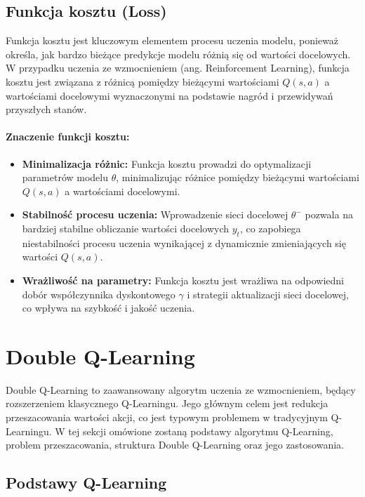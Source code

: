 \subsection{Funkcja kosztu (Loss)}

Funkcja kosztu jest kluczowym elementem procesu uczenia modelu, ponieważ określa, jak bardzo bieżące predykcje modelu różnią się od wartości docelowych. W przypadku uczenia ze wzmocnieniem (ang. Reinforcement Learning), funkcja kosztu jest związana z różnicą pomiędzy bieżącymi wartościami \(Q(s, a)\) a wartościami docelowymi wyznaczonymi na podstawie nagród i przewidywań przyszłych stanów.

\paragraph{Znaczenie funkcji kosztu:}
\begin{itemize}
	\item \textbf{Minimalizacja różnic:} Funkcja kosztu prowadzi do optymalizacji parametrów modelu \(\theta\), minimalizując różnice pomiędzy bieżącymi wartościami \(Q(s, a)\) a wartościami docelowymi.
	\item \textbf{Stabilność procesu uczenia:} Wprowadzenie sieci docelowej \(\theta^{-}\) pozwala na bardziej stabilne obliczanie wartości docelowych \(y_t\), co zapobiega niestabilności procesu uczenia wynikającej z dynamicznie zmieniających się wartości \(Q(s, a)\).
	\item \textbf{Wrażliwość na parametry:} Funkcja kosztu jest wrażliwa na odpowiedni dobór współczynnika dyskontowego \(\gamma\) i strategii aktualizacji sieci docelowej, co wpływa na szybkość i jakość uczenia.
\end{itemize}

\section{Double Q-Learning}

Double Q-Learning to zaawansowany algorytm uczenia ze wzmocnieniem, będący rozszerzeniem klasycznego Q-Learningu. Jego głównym celem jest redukcja przeszacowania wartości akcji, co jest typowym problemem w tradycyjnym Q-Learningu. W tej sekcji omówione zostaną podstawy algorytmu Q-Learning, problem przeszacowania, struktura Double Q-Learning oraz jego zastosowania.

\subsection{Podstawy Q-Learning}

